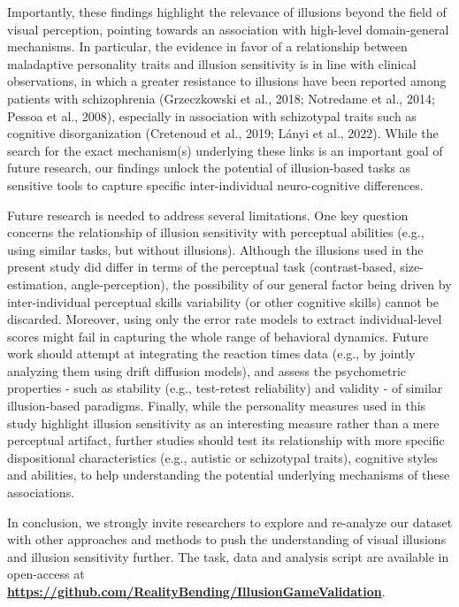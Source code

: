 \documentclass[
  man,floatsintext]{apa6}
\begin{document}
Importantly, these findings highlight the relevance of illusions beyond the field of visual perception, pointing towards an association with high-level domain-general mechanisms. In particular, the evidence in favor of a relationship between maladaptive personality traits and illusion sensitivity is in line with clinical observations, in which a greater resistance to illusions have been reported among patients with schizophrenia (Grzeczkowski et al., 2018; Notredame et al., 2014; Pessoa et al., 2008), especially in association with schizotypal traits such as cognitive disorganization (Cretenoud et al., 2019; Lányi et al., 2022). While the search for the exact mechanism(s) underlying these links is an important goal of future research, our findings unlock the potential of illusion-based tasks as sensitive tools to capture specific inter-individual neuro-cognitive differences.

Future research is needed to address several limitations. One key question concerns the relationship of illusion sensitivity with perceptual abilities (e.g., using similar tasks, but without illusions). Although the illusions used in the present study did differ in terms of the perceptual task (contrast-based, size-estimation, angle-perception), the possibility of our general factor being driven by inter-individual perceptual skills variability (or other cognitive skills) cannot be discarded. Moreover, using only the error rate models to extract individual-level scores might fail in capturing the whole range of behavioral dynamics. Future work should attempt at integrating the reaction times data (e.g., by jointly analyzing them using drift diffusion models), and assess the psychometric properties - such as stability (e.g., test-retest reliability) and validity - of similar illusion-based paradigms. Finally, while the personality measures used in this study highlight illusion sensitivity as an interesting measure rather than a mere perceptual artifact, further studies should test its relationship with more specific dispositional characteristics (e.g., autistic or schizotypal traits), cognitive styles and abilities, to help understanding the potential underlying mechanisms of these associations.

In conclusion, we strongly invite researchers to explore and re-analyze our dataset with other approaches and methods to push the understanding of visual illusions and illusion sensitivity further. The task, data and analysis script are available in open-access at \href{https://github.com/RealityBending/IllusionGameValidation}{\textbf{https://github.com/RealityBending/IllusionGameValidation}}.
\end{document}
